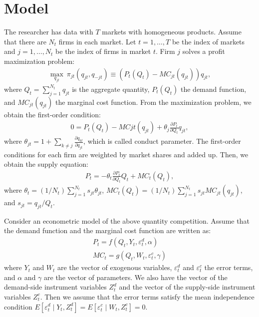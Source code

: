 \documentclass[11pt, a4paper]{article}
\begin{document}
\section{Model}
The researcher has data with $T$ markets with homogeneous products.
Assume that there are $N_t$ firms in each market.
Let $t = 1,\ldots, T$ be the index of markets and $j = 1, \ldots, N_t$ be the index of firms in market $t$.
Firm $j$ solves a profit maximization problem:
\begin{align*}
    \max_{q_{jt}} \ \pi_{jt}(q_{jt}, q_{-jt}) \equiv (P_t(Q_{t}) - MC_{jt}(q_{jt}))q_{jt},\nonumber
\end{align*}
where $Q_t = \sum_{j = 1}^{N_t} q_{jt}$ is the aggregate quantity, $P_t(Q_{t})$ the demand function, and $MC_{jt}(q_{jt})$ the marginal cost function.
From the maximization problem, we obtain the first-order condition:
\begin{align*}
    0 = P_t(Q_{t}) - MC{jt}(q_{jt}) + \theta_j \frac{\partial P_t}{\partial Q_t}q_{jt},\nonumber
\end{align*}
where $\theta_{jt} = 1 + \sum_{k\ne j}\frac{\partial q_{kt}}{\partial q_{jt}}$, which is called conduct parameter.
The first-order conditions for each firm are weighted by market shares and added up. 
Then, we obtain the supply equation:
\begin{align}
     P_t = -\theta_{t}\frac{\partial P_t}{\partial Q_t}Q_t + MC_t(Q_t),\label{eq:supply_equation}
\end{align}
where $\theta_t = (1/N_t)\sum_{j = 1}^{N_t} s_{jt}\theta_{jt}$, $MC_t(Q_t) = (1/N_t)\sum_{j = 1}^{N_t} s_{jt} MC_{jt}(q_{jt})$, and $s_{jt} = q_{jt}/Q_{t}$.

Consider an econometric model of the above quantity competition.
Assume that the demand function and the marginal cost function are written as: 
\begin{align}
    P_t = f(Q_t, Y_t, \varepsilon^{d}_{t}, \alpha) \label{eq:demand}\\
    MC_t = g(Q_t, W_{t}, \varepsilon^{c}_{t}, \gamma)\label{eq:marginal_cost}
\end{align}
where $Y_t$ and $W_{t}$ are the vector of exogenous variables, $\varepsilon^{d}_{t}$ and $\varepsilon^{c}_{t}$ the error terms, and $\alpha$ and $\gamma$ are the vector of parameters.
We also have the vector of the demand-side instrument variables $Z^{d}_{t}$ and the vector of the supply-side instrument variables $Z^{c}_{t}$.
Then we assume that the error terms satisfy the mean independence condition $E[\varepsilon^{d}_{t}\mid Y_t, Z^{d}_{t}] = E[\varepsilon^{c}_{t} \mid W_{t}, Z^{c}_{t}] =0$.
\end{document}
